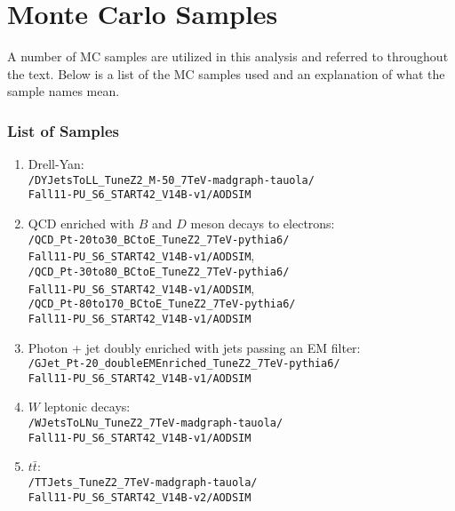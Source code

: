 \documentclass[dissertation.tex]{subfiles}
\begin{document}
\appendix
\chapter{Monte Carlo Samples}
\label{chap:Monte Carlo Samples}


A number of MC samples are utilized in this analysis and referred to throughout the text.  Below is a list of the MC samples used and an explanation of what the sample names mean.

\subsection{List of Samples}
\label{sec:List of Samples}

\begin{enumerate}
\item Drell-Yan:\\\verb+/DYJetsToLL_TuneZ2_M-50_7TeV-madgraph-tauola/+\\\verb+Fall11-PU_S6_START42_V14B-v1/AODSIM+
\item QCD enriched with $B$ and $D$ meson decays to electrons:\\\verb+/QCD_Pt-20to30_BCtoE_TuneZ2_7TeV-pythia6/+\\\verb+Fall11-PU_S6_START42_V14B-v1/AODSIM+,\\\verb+/QCD_Pt-30to80_BCtoE_TuneZ2_7TeV-pythia6/+\\\verb+Fall11-PU_S6_START42_V14B-v1/AODSIM+,\\\verb+/QCD_Pt-80to170_BCtoE_TuneZ2_7TeV-pythia6/+\\\verb+Fall11-PU_S6_START42_V14B-v1/AODSIM+
\item Photon + jet doubly enriched with jets passing an EM filter:\\\verb+/GJet_Pt-20_doubleEMEnriched_TuneZ2_7TeV-pythia6/+\\\verb+Fall11-PU_S6_START42_V14B-v1/AODSIM+
\item $W$ leptonic decays:\\\verb+/WJetsToLNu_TuneZ2_7TeV-madgraph-tauola/+\\\verb+Fall11-PU_S6_START42_V14B-v1/AODSIM+
\item $t\bar{t}$:\\\verb+/TTJets_TuneZ2_7TeV-madgraph-tauola/+\\\verb+Fall11-PU_S6_START42_V14B-v2/AODSIM+
\end{enumerate}
\end{document}
